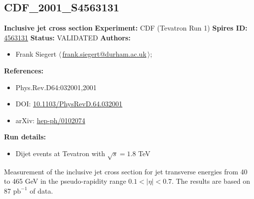 \subsection[CDF\_2001\_S4563131]{CDF\_2001\_S4563131\,\cite{Affolder:2001fa}}
\textbf{Inclusive jet cross section}\newline
\textbf{Experiment:} CDF (Tevatron Run 1) \newline
\textbf{Spires ID:} \href{http://www.slac.stanford.edu/spires/find/hep/www?rawcmd=key+4563131}{4563131}\newline
\textbf{Status:} VALIDATED\newline
\textbf{Authors:}
\begin{itemize}
  \item Frank Siegert $\langle\,$\href{mailto:frank.siegert@durham.ac.uk}{frank.siegert@durham.ac.uk}$\,\rangle$;
\end{itemize}
\textbf{References:}
\begin{itemize}
  \item Phys.Rev.D64:032001,2001
  \item DOI: \href{http://dx.doi.org/10.1103/PhysRevD.64.032001}{10.1103/PhysRevD.64.032001}
  \item arXiv: \href{http://arxiv.org/abs/hep-ph/0102074}{hep-ph/0102074}
\end{itemize}
\textbf{Run details:}
\begin{itemize}

  \item Dijet events at Tevatron with $\sqrt{s}=1.8$ TeV\end{itemize}

\noindent Measurement of the inclusive jet cross section for jet transverse energies from 40 to 465 GeV in the pseudo-rapidity range $0.1<|\eta|<0.7$. The results are based on 87 $\mathrm{pb}^{-1}$ of data.

\clearpage


\clearpage

